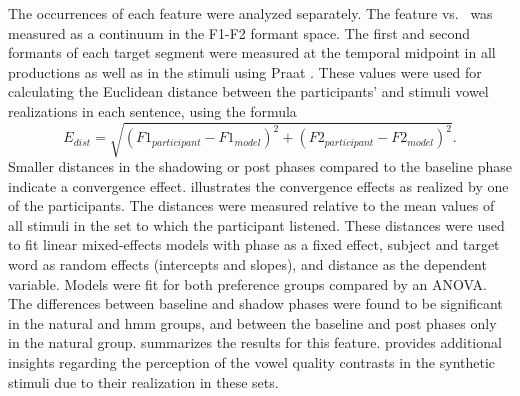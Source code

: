 The occurrences of each feature were analyzed separately.
The feature \textipa{[E:]} vs.\ \textipa{[e:]} was measured as a continuum in the F1-F2 formant space.
The first and second formants of each target segment were measured at the temporal midpoint in all productions as well as in the stimuli using Praat \citep{Boersma2018praat}.
These values were used for calculating the Euclidean distance between the participants' and stimuli vowel realizations in each sentence, using the formula
%
\begin{equation}
	E_{dist}=\sqrt{(F1_{participant}-F1_{model})^2+(F2_{participant}-F2_{model})^2}.
\end{equation}
\noindent
%
Smaller distances in the shadowing or post phases compared to the baseline phase indicate a convergence effect.
 illustrates the convergence effects as realized by one of the participants.
The distances were measured relative to the mean values of all stimuli in the set to which the participant listened.
These distances were used to fit linear mixed-effects models with phase as a fixed effect, subject and target word as random effects (intercepts and slopes), and distance as the dependent variable.
Models were fit for both preference groups compared by an ANOVA.
The differences between baseline and shadow phases were found to be significant in the natural and \ac{hmm} groups, and between the baseline and post phases only in the natural group.
 summarizes the results for this feature.
 provides additional insights regarding the perception of the vowel quality contrasts in the synthetic stimuli due to their realization in these sets.
%
